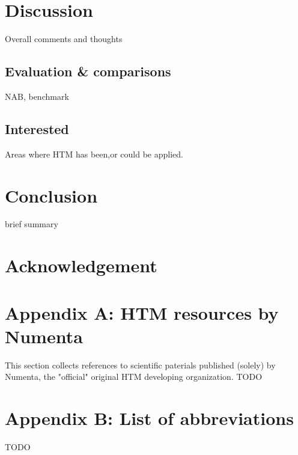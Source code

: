 \documentclass[a4,IEEEconf]{article}
\begin{document}
\section{Discussion}
Overall comments and thoughts
\subsection{Evaluation \& comparisons}
NAB, benchmark
\subsection{Interested}
Areas where HTM has been,or could be applied. 

\section{Conclusion}
brief summary

\section{Acknowledgement}

\section{Appendix A: HTM resources by Numenta}
This section collects references to scientific paterials published (solely) by Numenta, the "official" original HTM developing organization. 
TODO
\section{Appendix B: List of abbreviations}
TODO


\end{document}
